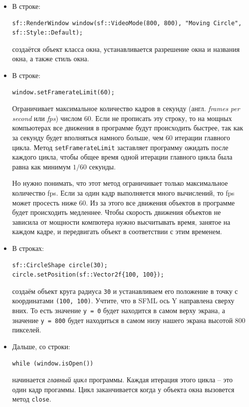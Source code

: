 \documentclass{article}
\begin{document}
\begin{itemize}
\item В строке:
\begin{lstlisting}[frame=none]
sf::RenderWindow window(sf::VideoMode(800, 800), "Moving Circle", sf::Style::Default);
\end{lstlisting}
создаётся объект класса окна, устанавливается разрешение окна и названия окна, а также стиль окна.
\item В строке:
\begin{lstlisting}[frame=none]
window.setFramerateLimit(60);
\end{lstlisting}
Ограничивает максимальное количество кадров в секунду (англ. \textit{frames per second} или \textit{fps}) числом 60. Если не прописать эту строку, то на мощных компьютерах все движения в программе будут происходить быстрее, так как за секунду будет вполняться намного больше, чем 60 итерации главного цикла. Метод \texttt{setFramerateLimit} заставляет программу ожидать после каждого цикла, чтобы общее время одной итерации главного цикла была равна как минимум $1/60$ секунды.

Но нужно понимать, что этот метод ограничивает только максимальное количество fps. Если за один кадр выполняется много вычислений, то fps может просесть ниже 60. Из за этого все движения объектов в программе будет происходить медленнее. Чтобы скорость движения объектов не зависила от мощности компютера нужно высчитывать время, занятое на каждом кадре, и передвигать объект в соответствии с этим временем.


\item В строках:
\begin{lstlisting}[frame=none]
sf::CircleShape circle(30);
circle.setPosition(sf::Vector2f{100, 100});
\end{lstlisting}
создаём объект круга радиуса \texttt{30} и устанавливаем его положение в точку с координатами \texttt{(100, 100)}. Учтите, что в SFML ось Y направлена сверху вних. То есть значение \texttt{y = 0} будет находится в самом верху экрана, а значение \texttt{y = 800} будет находиться в самом низу нашего экрана высотой 800 пикселей.


\item Дальше, со строки:
\begin{lstlisting}[frame=none]
while (window.isOpen())
\end{lstlisting}
начинается  \textit{главный цикл} программы. Каждая итерация этого цикла -- это один кадр прогаммы. Цикл заканчивается когда у объекта окна вызовется метод \texttt{close}.


\end{itemize}
\end{document}
